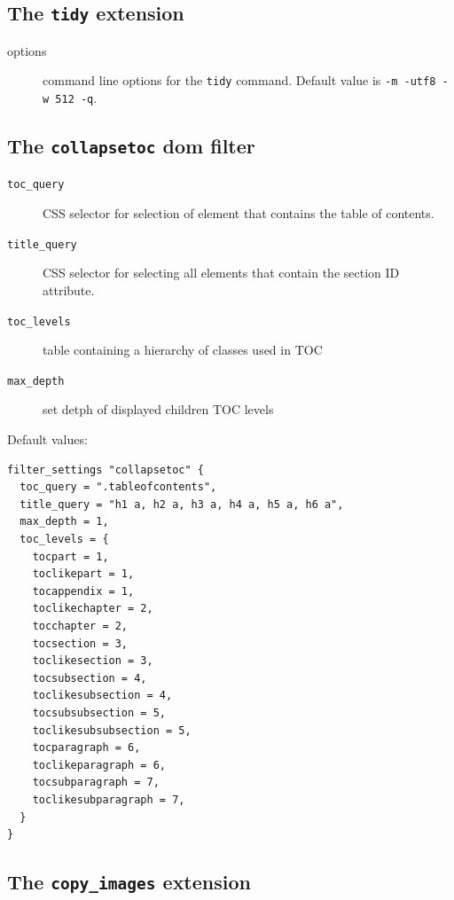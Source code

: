 \subsection{\texorpdfstring{The \texttt{tidy}
extension}{The tidy extension}}\label{the-tidy-extension}

\begin{description}
\item[options]
command line options for the \texttt{tidy} command. Default value is
\texttt{-m\ -utf8\ -w\ 512\ -q}.
\end{description}

\subsection{\texorpdfstring{The \texttt{collapsetoc} dom
filter}{The collapsetoc dom filter}}\label{the-collapsetoc-dom-filter}

\begin{description}
\item[\texttt{toc\_query}]
CSS selector for selection of element that contains the table of
contents.
\item[\texttt{title\_query}]
CSS selector for selecting all elements that contain the section ID
attribute.
\item[\texttt{toc\_levels}]
table containing a hierarchy of classes used in TOC
\item[\texttt{max\_depth}]
set detph of displayed children TOC levels
\end{description}

Default values:

\begin{verbatim}
filter_settings "collapsetoc" {
  toc_query = ".tableofcontents",
  title_query = "h1 a, h2 a, h3 a, h4 a, h5 a, h6 a",
  max_depth = 1,
  toc_levels = {
    tocpart = 1,
    toclikepart = 1,
    tocappendix = 1,
    toclikechapter = 2,
    tocchapter = 2,
    tocsection = 3,
    toclikesection = 3,
    tocsubsection = 4,
    toclikesubsection = 4,
    tocsubsubsection = 5,
    toclikesubsubsection = 5,
    tocparagraph = 6,
    toclikeparagraph = 6,
    tocsubparagraph = 7,
    toclikesubparagraph = 7,
  }
}
\end{verbatim}

\subsection{\texorpdfstring{The \texttt{copy\_images}
extension}{The copy\_images extension}}\label{the-copy_images-extension}


